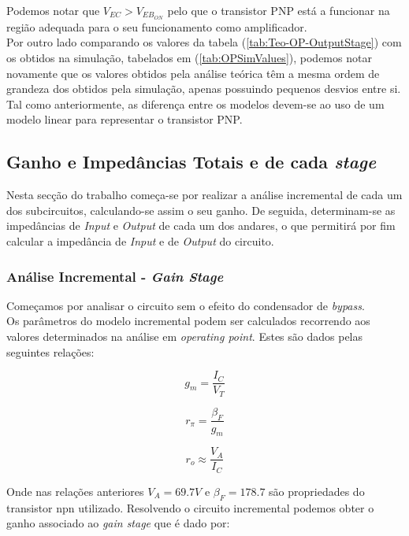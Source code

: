 Podemos notar que $V_{EC} > V_{EB_{ON}}$ pelo que o transistor PNP está a funcionar na região adequada para o seu funcionamento como 
amplificador.
\\
Por outro lado comparando os valores da tabela (\ref{tab:Teo-OP-OutputStage}) com os obtidos na simulação, tabelados em (\ref{tab:OPSimValues}),
podemos notar novamente que os valores obtidos pela análise teórica têm a mesma ordem de grandeza dos obtidos pela simulação, apenas
possuindo pequenos desvios entre si. Tal como anteriormente, as diferença entre os modelos devem-se ao uso de um modelo linear para
representar o transistor PNP.


\subsection{Ganho e Impedâncias Totais e de cada \emph{stage}}

Nesta secção do trabalho começa-se por realizar a análise incremental de cada um dos subcircuitos, calculando-se assim o seu ganho.
De seguida, determinam-se as impedâncias de \emph{Input} e \emph{Output} de cada um dos andares, o que permitirá por fim calcular a
impedância de \emph{Input} e de \emph{Output} do circuito.

\subsubsection{Análise Incremental - \emph{Gain Stage}}

Começamos por analisar o circuito sem o efeito do condensador de \emph{bypass}.
\\
Os parâmetros do modelo incremental podem ser calculados recorrendo aos valores determinados na análise em \emph{operating point}.
Estes são dados pelas seguintes relações:

\begin{equation}
  g_{m} = \frac{I_C}{V_T}
\end{equation}

\begin{equation}
  r_{\pi} = \frac{\beta_F}{g_m}
\end{equation}

\begin{equation}
  r_o \approx \frac{V_A}{I_C}
\end{equation}

Onde nas relações anteriores $V_A = 69.7 V$ e $\beta_F = 178.7$ são propriedades do transistor npn utilizado.
Resolvendo o circuito incremental podemos obter o ganho associado ao \emph{gain stage} que é dado por:

